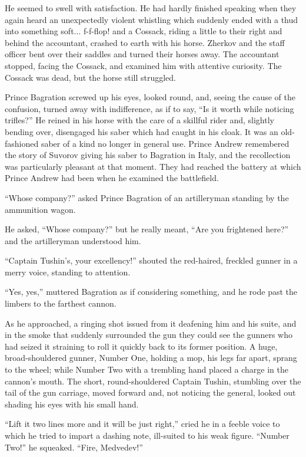 He seemed to swell with satisfaction. He had hardly finished
speaking when they again heard an unexpectedly violent whistling
which suddenly ended with a thud into something soft... f-f-flop!
and a Cossack, riding a little to their right and behind the
accountant, crashed to earth with his horse. Zherkov and the
staff officer bent over their saddles and turned their horses
away. The accountant stopped, facing the Cossack, and examined
him with attentive curiosity. The Cossack was dead, but the horse
still struggled.

Prince Bagration screwed up his eyes, looked round, and, seeing
the cause of the confusion, turned away with indifference, as if
to say, ``Is it worth while noticing trifles?'' He reined in his
horse with the care of a skillful rider and, slightly bending
over, disengaged his saber which had caught in his cloak. It was
an old-fashioned saber of a kind no longer in general use. Prince
Andrew remembered the story of Suvorov giving his saber to
Bagration in Italy, and the recollection was particularly
pleasant at that moment. They had reached the battery at which
Prince Andrew had been when he examined the battlefield.

``Whose company?'' asked Prince Bagration of an artilleryman
standing by the ammunition wagon.

He asked, ``Whose company?'' but he really meant, ``Are you
frightened here?'' and the artilleryman understood him.

``Captain Tushin's, your excellency!'' shouted the red-haired,
freckled gunner in a merry voice, standing to attention.

``Yes, yes,'' muttered Bagration as if considering something, and
he rode past the limbers to the farthest cannon.

As he approached, a ringing shot issued from it deafening him and
his suite, and in the smoke that suddenly surrounded the gun they
could see the gunners who had seized it straining to roll it
quickly back to its former position. A huge, broad-shouldered
gunner, Number One, holding a mop, his legs far apart, sprang to
the wheel; while Number Two with a trembling hand placed a charge
in the cannon's mouth. The short, round-shouldered Captain
Tushin, stumbling over the tail of the gun carriage, moved
forward and, not noticing the general, looked out shading his
eyes with his small hand.

``Lift it two lines more and it will be just right,'' cried he in
a feeble voice to which he tried to impart a dashing note,
ill-suited to his weak figure. ``Number Two!'' he
squeaked. ``Fire, Medvedev!''

